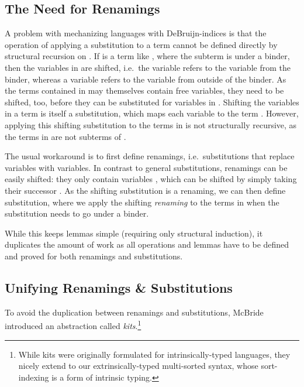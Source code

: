 \documentclass[sigplan,10pt, anonymous]{acmart}
\newcommand*\ACode[1]{\AgdaFontStyle{\textcolor{mygray}{#1}}}
\newcommand*\ACon[1]{\AgdaInductiveConstructor{#1}}
\begin{document}
  \subsection{The Need for Renamings}
  \label{sec:maps:renamings}
  A problem with mechanizing languages with DeBruijn-indices is that
  the operation of applying a substitution \ACode{σ} to a term
  \ACode{t} cannot be defined directly by structural recursion on
  \ACode{t}.
  If \ACode{t} is a term like \ACode{\ACon{λx} e},
  where the subterm \ACode{e} is under a binder, then the variables
  in \ACode{e} are shifted, i.e.\ the variable \ACode{\ACon{zero}} refers
  to the variable from the binder, whereas a variable \ACode{\ACon{suc} x}
  refers to the variable \ACode{x} from outside of the binder.
  As the terms contained in \ACode{σ} may themselves contain free variables,
  they need to be shifted, too, before they can be substituted
  for variables in \ACode{e}. 
  Shifting the variables in a term is itself a substitution, which maps
  each variable \ACode{x} to the term \ACode{\ACon{`} (\ACon{suc} x)}.
  However, applying this shifting substitution to the terms in
  \ACode{σ} is not structurally recursive, as the terms in \ACode{σ}
  are not subterms of \ACode{\ACon{λx} e}.

  The usual workaround is to first define renamings,
  i.e.\ substitutions that replace variables with variables.
  In contrast to general substitutions, renamings can be easily
  shifted: they only contain variables \ACode{x}, which can be
  shifted by simply taking their successor \ACode{\ACon{suc} x}.
  As the shifting substitution is a renaming, we can then define substitution,
  where we apply the shifting \emph{renaming} to the terms in \ACode{σ} when
  the substitution needs to go under a binder.

  While this keeps lemmas simple (requiring only structural induction),
  it duplicates the amount of work as all operations and lemmas have
  to be defined and proved for both renamings and substitutions.

  \subsection{Unifying Renamings \& Substitutions}
  \label{sec:maps:kits}
  To avoid the duplication between renamings and substitutions,
  McBride\cite{DBLP:journals/jar/BentonHKM12, unpublished:mcbride2005kits}
  introduced an abstraction called \emph{kits}.\footnote{
    While kits were originally formulated for intrinsically-typed languages,
    they nicely extend to our extrinsically-typed multi-sorted syntax, whose
    sort-indexing is a form of intrinsic typing.
  }
\end{document}
